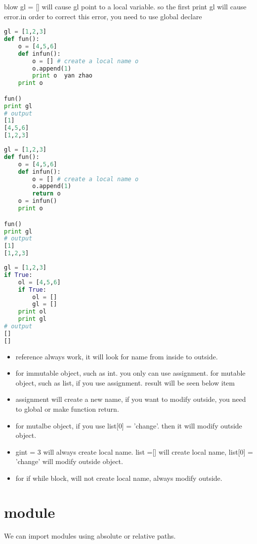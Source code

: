 \documentclass[a4paper,12pt,twoside]{book}
\begin{document}
blow gl = [] will cause gl point to a local variable. so the first print gl will cause error.in order to correct this error, you need to use global declare

\begin{lstlisting}[frame=single, language=python]
gl = [1,2,3]
def fun():
	o = [4,5,6]
	def infun():
		o = [] # create a local name o
		o.append(1)
		print o  yan zhao
	print o

fun()
print gl
# output 
[1]
[4,5,6]
[1,2,3]
\end{lstlisting}  

\begin{lstlisting}[frame=single, language=python]
gl = [1,2,3]
def fun():
	o = [4,5,6]
	def infun():
		o = [] # create a local name o
		o.append(1)
		return o
	o = infun()
	print o

fun()
print gl
# output 
[1]
[1,2,3]
\end{lstlisting}  


\begin{lstlisting}[frame=single, language=python]
gl = [1,2,3]
if True:
	ol = [4,5,6]
	if True:
		ol = []
		gl = []
	print ol
	print gl
# output 
[]
[]
\end{lstlisting}  





\begin{itemize}
		\item reference always work, it will look for name from inside to outside.
		\item for immutable object, such as int. you only can use assignment. for mutable object, such as list, if you use assignment. result will be seen below item
		\item assignment will create a new name, if you want to modify outside, you need to global or make function return.
		\item for mutalbe object, if you use list[0] = 'change'. then it will modify outside object.
		\item gint = 3 will always create local name. list =[] will create local name, list[0] = 'change' will modify outside object.
		\item for if while block, will not create local name, always modify outside. 
\end{itemize}

\section{module}
We can import modules using absolute or relative paths. 
\end{document}
